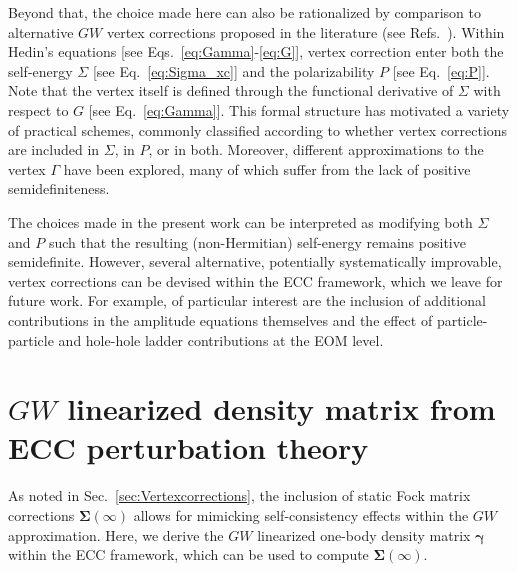 \documentclass[aip,jcp,reprint,noshowkeys,superscriptaddress]{revtex4-2}
\newcommand{\bgam}{\boldsymbol{\gamma}}
\newcommand{\bSig}{\boldsymbol{\Sigma}}
\begin{document}
Beyond that, the choice made here can also be rationalized by comparison to alternative $GW$ vertex corrections proposed in the literature (see Refs.~).
Within Hedin's equations [see Eqs.~\eqref{eq:Gamma}-\eqref{eq:G}], vertex correction enter both the self-energy $\Sigma$ [see Eq.~\eqref{eq:Sigma_xc}] and the polarizability $P$ [see Eq.~\eqref{eq:P}].
Note that the vertex itself is defined through the functional derivative of $\Sigma$ with respect to $G$ [see Eq.~\eqref{eq:Gamma}].
This formal structure has motivated a variety of practical schemes, commonly classified according to whether vertex corrections are included in $\Sigma$, in $P$, or in both. 
Moreover, different approximations to the vertex $\Gamma$ have been explored, \cite{Maggio_2017b,Vlcek_2019,Rohlfing_2023,Wen_2024,Forster_2025} many of which suffer from the lack of positive semidefiniteness. \cite{Pavlyukh_2016,Bruneval_2024,Bruneval_2025}

The choices made in the present work can be interpreted as modifying both $\Sigma$ and $P$ such that the resulting (non-Hermitian) self-energy remains positive semidefinite.
However, several alternative, potentially systematically improvable, vertex corrections can be devised within the ECC framework, which we leave for future work.
For example, of particular interest are the inclusion of additional contributions in the amplitude equations themselves and the effect of particle-particle and hole-hole ladder contributions at the EOM level.

\section{$GW$ linearized density matrix from ECC perturbation theory}
\label{sec:GWLDM}

As noted in Sec.~\ref{sec:Vertexcorrections}, the inclusion of static Fock matrix corrections $\bSig(\infty)$ allows for mimicking self-consistency effects within the $GW$ approximation.
Here, we derive the $GW$ linearized one-body density matrix $\bgam$ within the ECC framework, which can be used to compute $\bSig(\infty)$.
\end{document}
